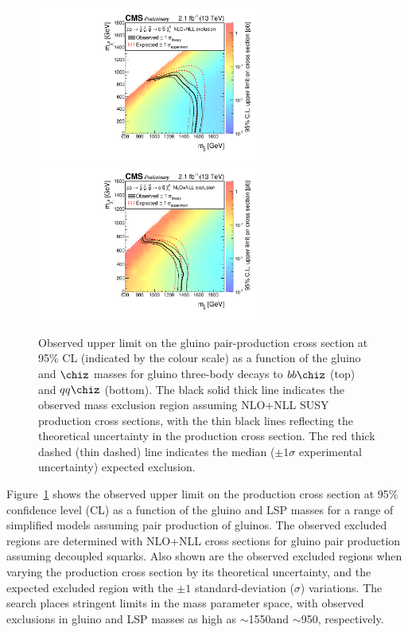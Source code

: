 \begin{figure}[thp!]
  \begin{center}
    \includegraphics[width=0.65\textwidth]{t1bbbbRA1XSEC.pdf} 
    \includegraphics[width=0.65\textwidth]{t1qqqqRA1XSEC.pdf} \\
    \caption{Observed upper limit on the gluino pair-production cross
      section at 95\% CL (indicated by the colour scale) as a function
      of the gluino and $\chiz$ masses for gluino three-body decays to
      $bb\chiz$ (top) and $qq\chiz$ (bottom). The black solid thick
      line indicates the observed mass exclusion region assuming
      NLO+NLL SUSY production cross sections, with the thin 
      black lines reflecting the theoretical uncertainty in the production
      cross section. The red thick dashed (thin dashed) line indicates the
      median (${\pm}1 \sigma$ experimental uncertainty) expected exclusion. 
      \label{fig:limits-sms} }
  \end{center}
\end{figure}

Figure~\ref{fig:limits-sms} shows the observed upper limit on the
production cross section at 95\% confidence level (CL) as a function
of the gluino and LSP masses for a range of simplified models assuming
pair production of gluinos. The observed excluded regions are
determined with NLO+NLL cross sections for gluino pair production
assuming decoupled squarks. Also shown are the observed excluded
regions when varying the production cross section by its theoretical
uncertainty, and the expected excluded region with the ${\pm}1$
standard-deviation ($\sigma$) variations. The search places stringent
limits in the mass parameter space, with observed exclusions in gluino
and LSP masses as high as $\sim$1550\gev and $\sim$950\gev,
respectively.

